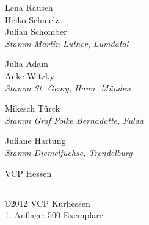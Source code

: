 \begin{centering}
\begin{multicols}{2}
Lena Rausch \\ Heiko Schmelz \\ Julian Schomber \\
\textit{Stamm Martin Luther, Lumdatal} \\ \vspace{10pt}

Julia Adam \\ Anke Witzky \\
\textit{Stamm St. Georg, Hann. Münden}  \\ \vspace{10pt}

Mikesch Türck \\ \textit{Stamm Graf Folke Bernadotte, Fulda} \\ \vspace{10pt}

Juliane Hartung \\ \textit{Stamm Diemelfüchse, Trendelburg} \\ \vspace{10pt}

VCP Hessen

\end{multicols}

\subsection*{}
\vspace{6em} \copyright 2012 VCP Kurhessen \\
1. Auflage: 500 Exemplare

\end{centering}

